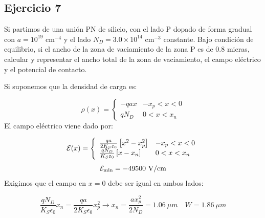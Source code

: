 
\begin{Enunciado}
\subsection*{Ejercicio 7} 

Si partimos de una unión PN de silicio, con el lado P dopado de forma gradual con 
$a = 10^{19}$ cm$^{-4}$ y el lado $N_D = 3.0 \times 10^{14}$ cm$^{-3}$ constante. 
Bajo condición de equilibrio, si el ancho de la zona de vaciamiento de la zona P es 
de 0.8 micras, calcular y representar el ancho total de la zona de vaciamiento, 
el campo eléctrico y el potencial de contacto.

\end{Enunciado}

Si suponemos que la densidad de carga es:

\begin{equation*}
    \rho (x) = \left\lbrace \begin{array}{ll}
        -q a x & -x_p < x < 0  \\ 
        q N_D & 0 < x < x_n  
    \end{array} \right.
\end{equation*}
El campo eléctrico viene dado por:

\begin{equation*}
    \mathcal{E} (x) =  \left\lbrace \begin{array}{ll}
        \frac{qa}{2K_S\varepsilon_0} \left[ x^2 - x_p^2 \right] & -x_p < x < 0  \\ 
        \frac{qN_D}{K_S\varepsilon_0} \left[ x- x_n \right] & 0 < x < x_n  
    \end{array} \right. 
\end{equation*}
\begin{equation*}
    \Ecal_{\min} = -49500 \ \unit{V/cm} 
\end{equation*}
Exigimos que el campo en $x=0$ debe ser igual en ambos lados:

\begin{equation}
    \frac{qN_D}{K_S \epsilon_0} x_n = \frac{qa}{2K_S\epsilon_0} x_p^2 \rightarrow x_n = \frac{a x_p^2}{2 N_D} = 1.06 \ \unit{\mu m} \quad W = 1.86 \ \unit{\mu m}
\end{equation}


